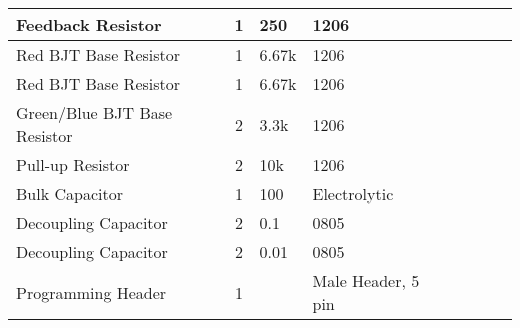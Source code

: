 \documentclass[12pt,letterpaper,onecolumn,landscape]{article}
\begin{document}
\begin{tabular}{ | p{4cm} | c | l | p{3cm} | p{4cm} | l | l | p{4cm} |}
	Feedback Resistor &
	1 & 				
	250\ohm & 		
	1206 & 		
	 & 		
	 & 
	 &
	
	\\ \hline

	Red BJT Base Resistor &
	1 & 				
	6.67k\ohm & 		
	1206 & 		
	 & 		
	 & 
	 &
	
	\\ \hline

	Red BJT Base Resistor &
	1 & 				
	6.67k\ohm & 		
	1206 & 		
	 & 		
	 & 
	 &
	
	\\ \hline	

	Green/Blue BJT Base Resistor &
	2 & 				
	3.3k\ohm & 		
	1206 & 		
	 & 		
	 & 
	 &
	
	\\ \hline
	
	Pull-up Resistor &
	2 & 				
	10k\ohm & 		
	1206 & 		
	 & 		
	 & 
	 &
	
	\\ \hline
	
	Bulk Capacitor &
	1 & 				
	100\uF & 		
	Electrolytic & 		
	 & 		
	 & 
	 &
	
	\\ \hline	

	Decoupling Capacitor &
	2 & 				
	0.1\uF & 		
	0805 & 		
	 & 		
	 & 
	 &
	
	\\ \hline
	
	Decoupling Capacitor &
	2 & 				
	0.01\uF & 		
	0805 & 		
	 & 		
	 & 
	 &
	
	\\ \hline
		
	Programming Header &
	1 & 				
	 & 		
	Male Header, 5 pin & 		
	 & 		
	 & 
	 &
	

\end{tabular}
\end{document}
